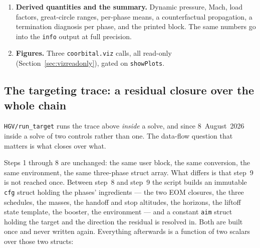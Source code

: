 \documentclass[11pt]{article}
\newcommand{\code}[1]{\texttt{#1}}
\begin{document}
\begin{enumerate}
\item \textbf{Derived quantities and the summary.} Dynamic pressure, Mach,
load factors, great-circle ranges, per-phase means, a counterfactual
propagation, a termination diagnosis per phase, and the printed block. The
same numbers go into the \code{info} output at full precision.

\item \textbf{Figures.} Three \code{coorbital.viz} calls, all read-only
(Section~\ref{sec:vizreadonly}), gated on \code{showPlots}.
\end{enumerate}

\subsection{The targeting trace: a residual closure over the whole chain}
\label{sec:aimflow}

\code{HGV/run\_target} runs the trace above \emph{inside} a solve, and since
8~August~2026 inside a solve of two controls rather than one. The data-flow
question that matters is what closes over what.

Steps 1 through 8 are unchanged: the same user block, the same conversion, the
same environment, the same three-phase struct array. What differs is that
step~9 is not reached once. Between step~8 and step~9 the script builds an
immutable \code{cfg} struct holding the phases' ingredients --- the two EOM
closures, the three schedules, the masses, the handoff and stop altitudes, the
horizons, the liftoff state template, the booster, the environment --- and a
constant \code{aim} struct holding the target and the direction the residual
is resolved in. Both are built once and never written again. Everything
afterwards is a function of two scalars over those two structs:
\end{document}

